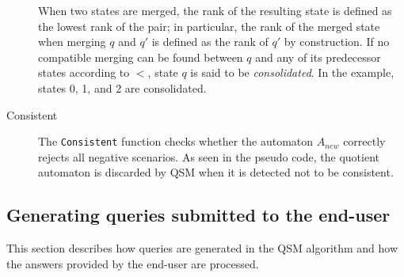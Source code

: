 \begin{description}
When two states are merged, the rank of the resulting state is defined as the lowest rank of the pair; in particular, the rank of the merged state when merging $q$ and $q'$ is defined as the rank of $q'$ by construction. If no compatible merging can be found between $q$ and any of its predecessor states according to $<$, state $q$ is said to be \textsl{consolidated}. In the example, states 0, 1, and 2 are consolidated.

\item[Consistent] The \texttt{Consistent} function checks whether the automaton $A_{new}$ correctly rejects all negative scenarios. As seen in the pseudo code, the quotient automaton is discarded by \textsc{QSM} when it is detected not to be consistent.

\end{description}

\subsection{Generating queries submitted to the end-user\label{QSM:query}}

This section describes how queries are generated in the \textsc{QSM} algorithm and how the answers provided by the end-user are processed.

